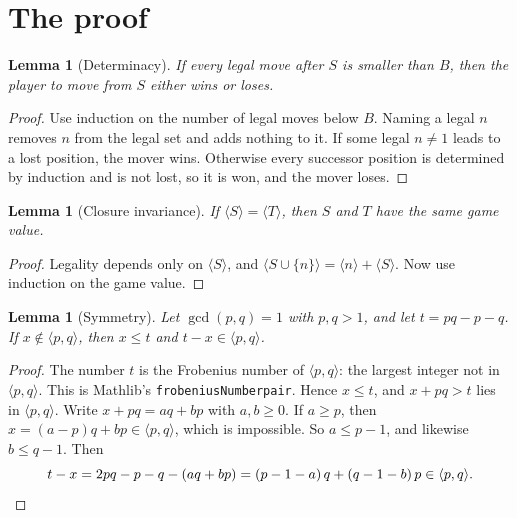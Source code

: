\documentclass[11pt]{article}
\newtheorem{lemma}[theorem]{Lemma}
\theoremstyle{definition}
\theoremstyle{remark}
\renewcommand{\_}{\oldus\allowbreak}
\begin{document}
\section{The proof}

\begin{lemma}[Determinacy]\label{lem:det}
If every legal move after $S$ is smaller than $B$, then the player to move from $S$ either wins or loses.
\end{lemma}
\begin{proof}
Use induction on the number of legal moves below $B$. Naming a legal $n$ removes $n$ from the legal set
and adds nothing to it. If some legal $n \ne 1$ leads to a lost position, the mover wins. Otherwise
every successor position is determined by induction and is not lost, so it is won, and the mover loses.
\end{proof}

\begin{lemma}[Closure invariance]\label{lem:cl}
If $\langle S\rangle = \langle T\rangle$, then $S$ and $T$ have the same game value.
\end{lemma}
\begin{proof}
Legality depends only on $\langle S\rangle$, and
$\langle S\cup\{n\}\rangle = \langle n\rangle + \langle S\rangle$. Now use induction on the game value.
\end{proof}

\begin{lemma}[Symmetry]\label{lem:sym}
Let $\gcd(p,q)=1$ with $p,q>1$, and let $t = pq-p-q$. If $x \notin \langle p,q\rangle$, then $x \le t$
and $t-x \in \langle p,q\rangle$.
\end{lemma}
\begin{proof}
The number $t$ is the Frobenius number of $\langle p,q\rangle$: the largest integer not in
$\langle p, q\rangle$. This is Mathlib's \texttt{frobeniusNumber\_pair}. Hence $x \le t$, and
$x+pq > t$ lies in $\langle p,q\rangle$. Write $x+pq = aq+bp$ with $a,b\ge 0$. If $a \ge p$, then
$x=(a-p)q+bp \in \langle p,q\rangle$, which is impossible. So $a \le p-1$, and likewise $b \le q-1$.
Then
\[
t-x = 2pq - p - q - (aq+bp) = (p-1-a)\,q + (q-1-b)\,p \in \langle p,q\rangle. \qedhere
\]
\end{proof}
\end{document}

